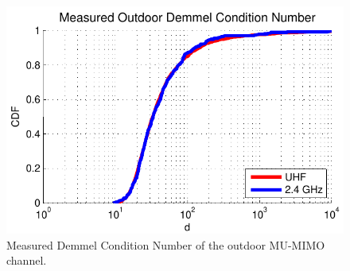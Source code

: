 \begin{figure}[t]
\centering
  \includegraphics[width=0.7\linewidth]{figs/measSpatCorr}   
    \caption{Measured Demmel Condition Number of the outdoor MU-MIMO channel.}\label{fig:measSpat}
		\vspace{-5mm}
\end{figure}


